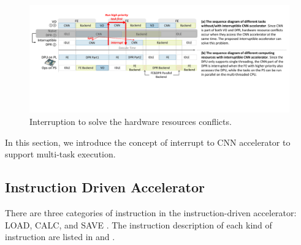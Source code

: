 \label{sec:cnninterrupt}





\begin{figure}[t]
	\centering
	\includegraphics[width=0.99\linewidth]{fig/interDPR.pdf}
    \caption{Interruption to solve the hardware resources conflicts.  
    }
	\label{fig:interDPR}
\end{figure}


In this section, we introduce the concept of interrupt to CNN accelerator to support multi-task execution.

\subsection{ Instruction Driven Accelerator }

There are three categories of instruction in the instruction-driven accelerator: LOAD, CALC, and SAVE \cite{guo2017angel, yu2018instruction}. The instruction description of each kind of instruction are listed in  and .


